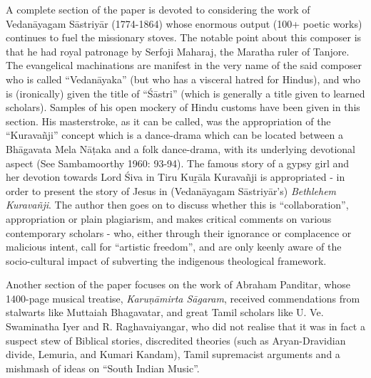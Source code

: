 A complete section of the paper is devoted to considering the work of Vedanāyagam Sāstriyār (1774-1864) whose enormous output (100+ poetic works) continues to fuel the missionary stoves. The notable point about this composer is that he had royal patronage by Serfoji Maharaj, the Maratha ruler of Tanjore. The evangelical machinations are manifest in the very name of the said composer who is called “Vedanāyaka” (but who has a visceral hatred for Hindus), and who is (ironically) given the title of “Śāstri” (which is generally a title given to learned scholars). Samples of his open mockery of Hindu customs have been given in this section. His masterstroke, as it can be called, was the appropriation of the “Kuravañji” concept which is a dance-drama which can be located between a Bhāgavata Mela Nāṭaka and a folk dance-drama, with its underlying devotional aspect (See Sambamoorthy 1960: 93-94). The famous story of a gypsy girl and her devotion towards Lord Śiva in Tiru Kuṟāla Kuravañji is appropriated - in order to present the story of Jesus in (Vedanāyagam Sāstriyār’s) \textit{Bethlehem Kuravañji}. The author then goes on to discuss whether this is “collaboration”, appropriation or plain plagiarism, and makes critical comments on various contemporary scholars - who, either through their ignorance or complacence or malicious intent, call for “artistic freedom”, and are only keenly aware of the socio-cultural impact of subverting the indigenous theological framework.

Another section of the paper focuses on the work of Abraham Panditar, whose 1400-page musical treatise, \textit{Karuṇāmirta Sāgaram}, received commendations from stalwarts like Muttaiah Bhagavatar, and great Tamil scholars like U. Ve. Swaminatha Iyer and R. Raghavaiyangar, who did not realise that it was in fact a suspect stew of Biblical stories, discredited theories (such as Aryan-Dravidian divide, Lemuria, and Kumari Kandam), Tamil supremacist arguments and a mishmash of ideas on “South Indian Music”.


